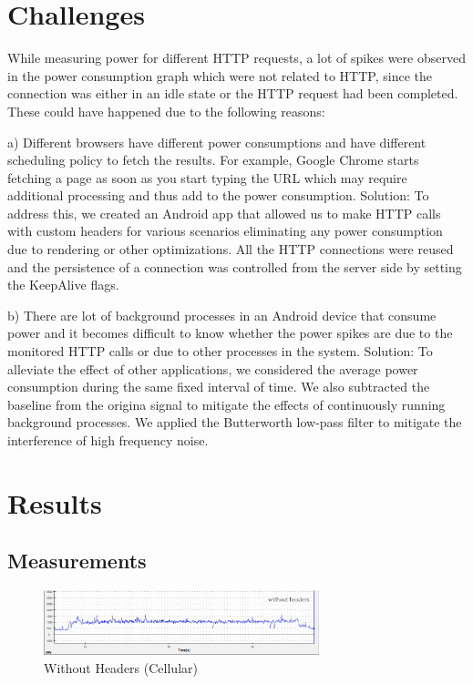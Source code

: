 \documentclass[9pt]{sigplan-proc-varsize}
\begin{document}
\section{ Challenges}

While measuring power for different HTTP requests, a lot of spikes were observed in the power consumption graph which were not related to HTTP, since the connection was either in an idle state or the HTTP request had been completed. These could have happened due to the following reasons: 

a) Different browsers have different power consumptions and have different scheduling policy to fetch the results. For example, Google Chrome starts fetching a page as soon as you start typing the URL which may require additional processing and thus add to the power consumption.
Solution: To address this, we created an Android app that allowed us to make HTTP calls with custom headers for various scenarios eliminating any power consumption due to rendering or other optimizations. All the HTTP connections were reused and the persistence of a connection was controlled from the server side by setting the KeepAlive flags.

b) There are lot of background processes in an Android device that consume power and it becomes difficult to know whether the power spikes are due to the monitored HTTP calls or due to other processes in the system.
Solution: To alleviate the effect of other applications, we considered the average power consumption during the same fixed interval of time. We also subtracted the baseline from the origina signal to mitigate the effects of continuously running background processes. We applied the Butterworth low-pass filter to mitigate the interference of high frequency noise.

\bigskip

\section{Results}

\subsection{Measurements}

\begin{figure}[ht!]
\centering
\includegraphics[width=80mm]{cellular_withoutheaders.png}
\caption{Without Headers (Cellular) }
\label{fig:sp_gd_mnist}
\end{figure}
\end{document}
